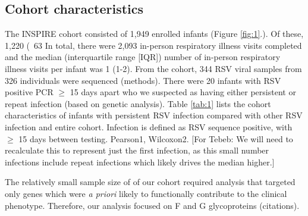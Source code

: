 \documentclass{article}
\begin{document}
\subsection{Cohort characteristics}
The INSPIRE cohort consisted of 1,949 enrolled infants 
(Figure \ref{fig:1}.).
Of these, 1,220 (~63%
In total, there were 2,093 in-person respiratory illness visits completed and the median (interquartile range [IQR]) number of in-person respiratory illness visits per infant was 1 (1-2). 
From the cohort, 344 RSV viral samples from 326 individuals were sequenced (methods).
There were 20 infants with RSV positive PCR $\ge$ 15 days apart who we suspected as having either persistent or repeat infection (based on genetic analysis).
Table \ref{tab:1} lists the cohort characteristics of infants with persistent RSV infection compared with other RSV infection and entire cohort. 
Infection is defined as RSV sequence positive, with $\ge$ 15 days between testing. Pearson1, Wilcoxon2.
[For Tebeb: We will need to recalculate this to represent just the first infection, as this small number infections include repeat infections which likely drives the median higher.]

The relatively small sample size of of our cohort required analysis that targeted only genes which were \textit{a priori} likely to functionally contribute to the clinical phenotype. 
Therefore, our analysis focused on F and G glycoproteins (citations).
\end{document}
